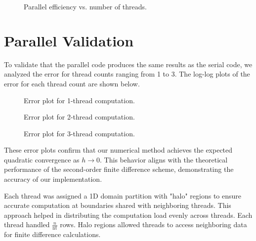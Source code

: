 \documentclass[12pt]{article}
\begin{document}
\begin{figure}[h!]
\centering
\caption{Parallel efficiency vs. number of threads.}
\label{fig:timing_plots}
\end{figure}

\section{Parallel Validation}

To validate that the parallel code produces the same results as the serial code, we analyzed the error for thread counts ranging from 1 to 3. The log-log plots of the error for each thread count are shown below.

\begin{figure}[H]
\centering
\caption{Error plot for 1-thread computation.}
\label{fig:error_1threads}
\end{figure}

\begin{figure}[H]
\centering
\caption{Error plot for 2-thread computation.}
\label{fig:error_2threads}
\end{figure}

\begin{figure}[H]
\centering
\caption{Error plot for 3-thread computation.}
\label{fig:error_3threads}
\end{figure}

These error plots confirm that our numerical method achieves the expected quadratic convergence as \( h \rightarrow 0 \). This behavior aligns with the theoretical performance of the second-order finite difference scheme, demonstrating the accuracy of our implementation.

Each thread was assigned a 1D domain partition with "halo" regions to ensure accurate computation at boundaries shared with neighboring threads. This approach helped in distributing the computation load evenly across threads. Each thread handled \(\frac{n}{\text{nt}}\) rows. Halo regions allowed threads to access neighboring data for finite difference calculations.
\end{document}
